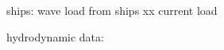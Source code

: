 ships: wave load from ships xx
current load

hydrodynamic data: 


\begin{comment}

\section{Interpretation}
Per theme:
Inperpret results
- Identify correlations, patterns, and relationships in data
- Did results meet expectations or hypotheses
- Contextualize findings within previous research and theory
- Explain unexpected results and evaluate their significance
- Consider possible alternative explanations and make an argument for your position
Implication
- Do results support or challenge existing theories and literature? 
- If they support existing theories, what new information do they contribute?
- If they challenge existing theories, why do you think that is?
- Are there any practical implications?

Stakeholders:
Stakeholders identified, with goals and interests
Key players: ports, dredgers, ANPYN
Interview results: two ships active today, river sand for construction, low demand so for fracking likely
Effects: erosion of 30 meters from dredging and cargo
Dry sand mining: 350 trucks with 9000 tons of sand daily, road conditions, supply fracking industry, transported to Anelo
Stakeholders updated: campings more power, dredgers less, ports less interest and power, municipalities introduced. Oppositon increased for landowners and campings

Sand extraction:


Multiple stakeholders, such as the mayor of Ibicuy and the mine manager, explained that mined sand gets transported by trucks to Añelo, a town in Neuquén that forms the heart of the Vaca Muerta fracking activities. This view is confirmed by various reports \autocite{cauceArenasParaFracking2022} \autocite{secretariadepoliticamineraArenasParaFracking2019}.
Geology: borehole, characteristics sand
Consequences: natural habitat, social, economic effects, stakeholders
The most frequently voiced concerns of stakeholders is the poor conditions of roads, especially the provincial RP45 that forms the entrance to the town, caused by intense heavy truck traffic. These comments were confirmed during the field trip, since many potholes were observed along the entire route.

Hydrodynamical and sedimentary analysis:
xx

Delft3D Model:
xx

Mitigation strategies:
xx

4: Limitations
provide an accurate picture of what can and cannot be concluded from your study.
Limitations might be due to research design, methodological choices, or unanticipated obstacles that emerged.
Reiterate why the results are valid for answering research question.

\end{comment}

